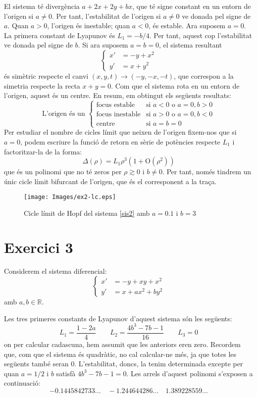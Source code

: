 \documentclass[a4paper]{article}
\newcommand{\RR}{\ensuremath{\mathbb{R}}} %
\theoremstyle{definition}
\begin{document}
El sistema té divergència $a+2x+2y+bx$, que té signe constant en un entorn de l'origen si $a\ne 0$. Per tant, l'estabilitat de l'origen si $a\ne 0$ ve donada pel signe de $a$. Quan $a>0$, l'origen és inestable; quan $a<0$, és estable. Ara suposem $a=0$. La primera constant de Lyapunov és $L_1=-b/4$. Per tant, aquest cop l'estabilitat ve donada pel signe de $b$. Si ara suposem $a=b=0$, el sistema resultant
$$
  \left\{
  \begin{aligned}
    x' & =-y+x^2  \\
    y' & =x + y^2
  \end{aligned}
  \right.
$$
és simètric respecte el canvi $(x, y, t)\to(-y,-x,-t)$, que correspon a la simetria respecte la recta $x+y=0$. Com que el sistema rota en un entorn de l'origen, aquest és un centre. En resum, em obtingut els següents resultats:
$$\text{L'origen és un }
  \begin{cases}
    \text{focus estable}   & \text{si } a < 0 \text{ o } a = 0, b>0  \\
    \text{focus inestable} & \text{si } a > 0  \text{ o } a = 0, b<0 \\
    \text{centre}          & \text{si } a = b= 0
  \end{cases}
$$
Per estudiar el nombre de cicles límit que neixen de l'origen fixem-nos que si $a=0$, podem escriure la funció de retorn en sèrie de potències respecte $L_1$ i factoritzar-la de la forma:
$$\Delta (\rho)=L_1\rho^3(1 + \mathrm{O}(\rho^2))$$
que és un polinomi que no té zeros per $\rho\gtrsim 0$ i $b\ne 0$. Per tant, només tindrem un únic cicle límit bifurcant de l'origen, que és el corresponent a la traça.
\begin{figure}[ht]
  \centering
  \texttt{[image: Images/ex2-lc.eps]}
  \caption{Cicle límit de Hopf del sistema \eqref{sis2} amb $a=0.1$ i $b=3$}
\end{figure}
\section*{Exercici 3}
Considerem el sistema diferencial:
\begin{equation}\label{sis3}
  \left\{
  \begin{aligned}
    x' & =-y+xy+x^2      \\
    y' & =x + ax^2 +by^2
  \end{aligned}
  \right.
\end{equation}
amb $a,b\in\RR$.

Les tres primeres constants de Lyapunov d'aquest sistema són les següents:
$$L_1=\frac{1-2a}{4}\qquad L_2=\frac{4b^3-7b-1}{16}\qquad L_3 = 0$$
on per calcular cadascuna, hem assumit que les anteriors eren zero. Recordem que, com que el sistema és quadràtic, no cal calcular-ne més, ja que totes les següents també seran 0. L'estabilitat, doncs, la tenim determinada excepte per quan $a=1/2$ i $b$ satisfà $4b^3-7b-1=0$. Les arrels d'aquest polinomi s'exposen a continuació: $$-0.1445842733...\quad -1.244644286...\quad 1.389228559...$$
\end{document}
